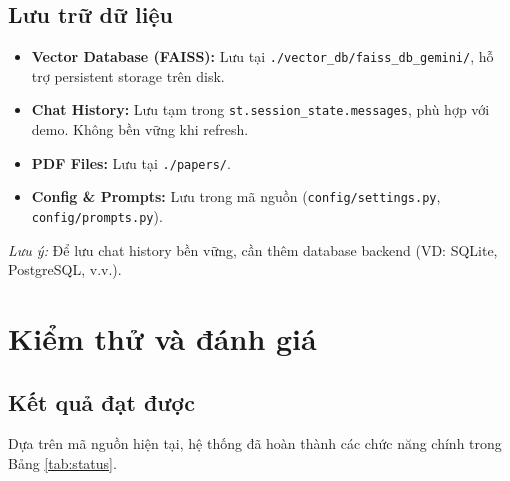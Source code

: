 \documentclass[10pt, conference, a4paper, compsocconf]{IEEEtran}
\begin{document}
\subsection{Lưu trữ dữ liệu}
\begin{itemize}
    \item \textbf{Vector Database (FAISS):} Lưu tại \verb|./vector_db/faiss_db_gemini/|, hỗ trợ persistent storage trên disk.
    
    \item \textbf{Chat History:} Lưu tạm trong \verb|st.session_state.messages|, phù hợp với demo. Không bền vững khi refresh.
    
    \item \textbf{PDF Files:} Lưu tại \verb|./papers/|.
    
    \item \textbf{Config \& Prompts:} Lưu trong mã nguồn (\texttt{config/settings.py}, \texttt{config/prompts.py}).
\end{itemize}

\textit{Lưu ý:} Để lưu chat history bền vững, cần thêm database backend (VD: SQLite, PostgreSQL, v.v.).

\section{Kiểm thử và đánh giá}
\subsection{Kết quả đạt được}
Dựa trên mã nguồn hiện tại, hệ thống đã hoàn thành các chức năng chính trong Bảng \ref{tab:status}.
\begin{table}[ht]
\centering
\caption{Tổng hợp trạng thái chức năng}
\label{tab:status}
\end{table}
\end{document}
